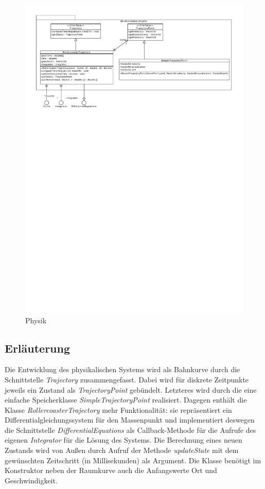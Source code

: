 \begin{figure}
\includegraphics[width=\linewidth]{bilder/Physics}
\caption{Physik}
\label{fig:physics}
\end{figure}

\subsection{Erläuterung}

Die Entwicklung des physikalischen Systems wird als Bahnkurve durch die Schnittstelle
\emph{Trajectory} zusammengefasst. Dabei wird für diskrete Zeitpunkte jeweils ein
Zustand als \emph{TrajectoryPoint} gebündelt. Letzteres wird durch die eine
einfache Speicherklasse \emph{SimpleTrajectoryPoint} realisiert.
Dagegen enthält die Klasse \emph{RollercoasterTrajectory} mehr Funktionalität: sie
repräsentiert ein Differentialgleichungssystem für den Massenpunkt und implementiert
deswegen die Schnittstelle \emph{DifferentialEquations} als Callback-Methode für
die Aufrufe des eigenen \emph{Integrator} für die Lösung des Systems. Die Berechnung
eines neuen Zustands wird von Außen durch Aufruf der Methode \emph{updateState} mit
dem gewünschten Zeitschritt (in Millisekunden) als Argument. Die Klasse benötigt im 
Konstruktor neben der Raumkurve auch die Anfangswerte Ort und Geschwindigkeit.

